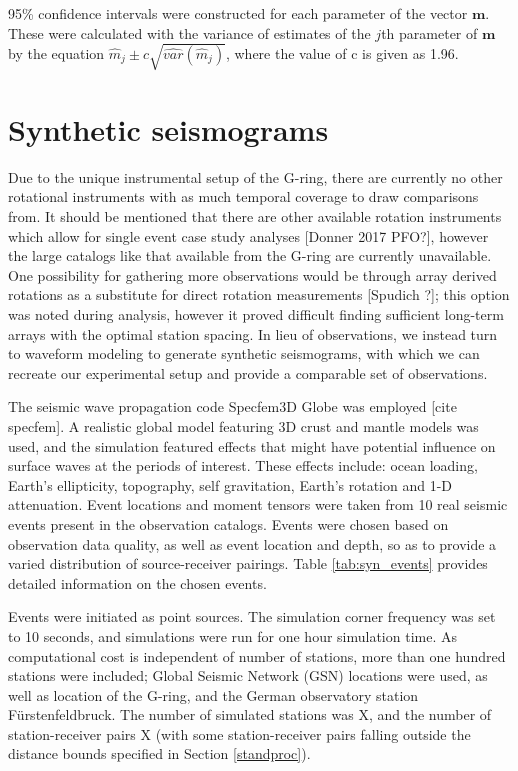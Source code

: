 \documentclass{gji}
\begin{document}
95\% confidence intervals were constructed for each parameter of the vector $\mathbf{m}$. These were calculated with the variance of estimates of the $j$th parameter of $\mathbf{m}$ by the equation $\hat{m}_j \pm c \sqrt{\hat{var}(\hat{m}_j)}$, where the value of c is given as 1.96.

\section{Synthetic seismograms}
Due to the unique instrumental setup of the G-ring, there are currently no other rotational instruments with as much temporal coverage to draw comparisons from. It should be mentioned that there are other available rotation instruments which allow for single event case study analyses [Donner 2017 PFO?], however the large catalogs like that available from the G-ring are currently unavailable. One possibility for gathering more observations would be through array derived rotations as a substitute for direct rotation measurements [Spudich ?]; this option was noted during analysis, however it proved difficult finding sufficient long-term arrays with the optimal station spacing.  In lieu of observations, we instead turn to waveform modeling to generate synthetic seismograms, with which we can recreate our experimental setup and provide a comparable set of observations.

The seismic wave propagation code Specfem3D Globe was employed [cite specfem]. A realistic global model featuring 3D crust and mantle models was used, and the simulation featured effects that might have potential influence on surface waves at the periods of interest. These effects include: ocean loading, Earth's ellipticity, topography, self gravitation, Earth's rotation and 1-D attenuation. Event locations and moment tensors were taken from 10 real seismic events present in the observation catalogs. Events were chosen based on observation data quality, as well as event location and depth, so as to provide a varied distribution of source-receiver pairings. Table \ref{tab:syn_events} provides detailed information on the chosen events. 

Events were initiated as point sources. The simulation corner frequency was set to 10 seconds, and simulations were run for one hour simulation time. As computational cost is independent of number of stations, more than one hundred stations were included; Global Seismic Network (GSN) locations were used, as well as location of the G-ring, and the German observatory station F\"urstenfeldbruck. The number of simulated stations was X, and the number of station-receiver pairs X (with some station-receiver pairs falling outside the distance bounds specified in Section \ref{standproc}).
\end{document}
